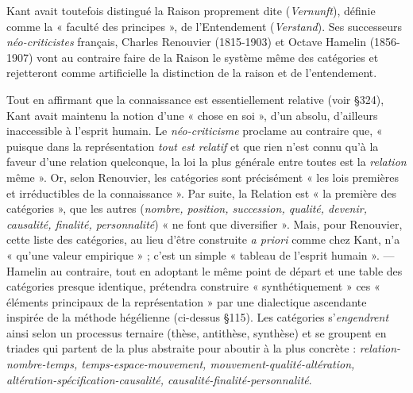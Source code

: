 Kant avait toutefois distingué la Raison proprement dite ({\it Vernunft}), définie comme la « faculté des principes », de l’Entendement
({\it Verstand}). Ses successeurs {\it néo-criticistes} français, Charles Renouvier
(1815-1903) et Octave Hamelin (1856-1907) vont au contraire faire
de la Raison le système même des catégories et rejetteront comme
artificielle la distinction de la raison et de l’entendement.

\vspace{0.24cm}
{\footnotesize
Tout en affirmant que la connaissance est essentiellement relative
(voir \S 324), Kant avait maintenu la notion d’une « chose en soi », d’un
absolu, d’ailleurs inaccessible à l'esprit humain. Le {\it néo-criticisme} proclame
au contraire que, « puisque dans la représentation {\it tout est relatif} et que rien
n’est connu qu’à la faveur d’une relation quelconque, la loi la plus générale
entre toutes est la {\it relation} même ». Or, selon Renouvier, les catégories
sont précisément « les lois premières et irréductibles de la connaissance ».
Par suite, la \si{Relation} est « la première des catégories », que les autres
({\it nombre, position, succession, qualité, devenir, causalité, finalité, personnalité})
« ne font que diversifier ». Mais, pour Renouvier, cette liste des catégories,
au lieu d’être construite {\it a priori} comme chez Kant, n’a « qu’une valeur
empirique » ; c’est un simple « tableau de l’esprit humain ». — Hamelin au
contraire, tout en adoptant le même point de départ et une table des
catégories presque identique, prétendra construire « synthétiquement » ces
« éléments principaux de la représentation » par une dialectique ascendante
inspirée de la méthode hégélienne (ci-dessus \S 115). Les catégories s’{\it engendrent} ainsi selon un processus ternaire (thèse, antithèse, synthèse) et se
groupent en triades qui partent de la plus abstraite pour aboutir à la plus
concrète : {\it relation-nombre-temps, temps-espace-mouvement, mouvement-qualité-altération,
altération-spécification-causalité, causalité-finalité-personnalité}.}
\vspace{0.31cm}

